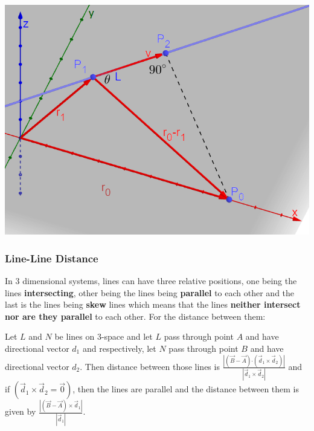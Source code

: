 \documentclass[12pt]{article}
\newcommand{\dotp}{{\boldsymbol \cdot}}
\begin{document}
\includegraphics[scale=0.715]{pln.png}

\newpage
\subsubsection{Line-Line Distance}
In 3 dimensional systems, lines can have three relative positions, one being the lines \textbf{intersecting}, other being the lines being \textbf{parallel} to each other and the last is the lines being \textbf{skew} lines which means that the lines \textbf{neither intersect nor are they parallel} to each other. For the distance between them:

Let $L$ and $N$ be lines on 3-space and let $L$ pass through point $A$ and have directional vector $d_1$ and respectively, let $N$ pass through point $B$ and have directional vector $d_2$. Then distance between those lines is
$\displaystyle{\frac{|(\vec B - \vec A)\dotp(\vec d_1 \times \vec d_2)|}{|\vec d_1 \times \vec d_2|}}$ and if $(\vec d_1 \times \vec d_2 = \vec 0)$, then the lines are parallel and the distance between them is given by $\displaystyle{\frac{|(\vec B - \vec A)\times \vec d_1|}{|\vec d_1|}}$.
\end{document}
